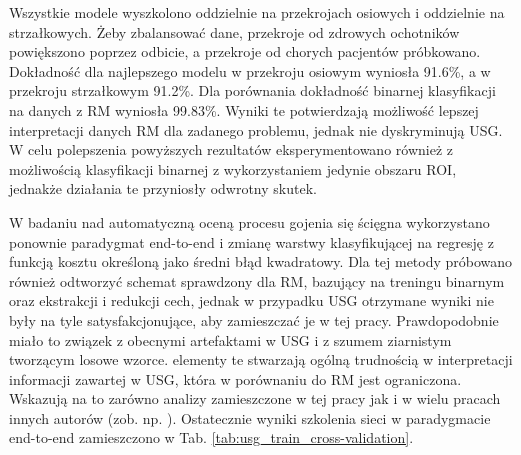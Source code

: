 Wszystkie modele wyszkolono oddzielnie na przekrojach osiowych i oddzielnie na strzałkowych. Żeby zbalansować dane, przekroje od zdrowych ochotników powiększono poprzez odbicie, a przekroje od chorych pacjentów próbkowano. Dokładność dla najlepszego modelu w przekroju osiowym wyniosła 91.6\%, a w przekroju strzałkowym 91.2\%. Dla porównania dokładność binarnej klasyfikacji na danych z RM wyniosła 99.83\%. Wyniki te potwierdzają możliwość lepszej interpretacji danych RM dla zadanego problemu, jednak nie dyskryminują USG. W celu polepszenia powyższych rezultatów eksperymentowano również z możliwością klasyfikacji binarnej z wykorzystaniem jedynie obszaru ROI, jednakże działania te przyniosły odwrotny skutek.  

W badaniu nad automatyczną oceną procesu gojenia się ścięgna wykorzystano ponownie paradygmat end-to-end i zmianę warstwy klasyfikującej na regresję z funkcją kosztu określoną jako średni błąd kwadratowy. Dla tej metody próbowano również odtworzyć schemat sprawdzony dla RM, bazujący na treningu binarnym oraz ekstrakcji i redukcji cech, jednak w przypadku USG otrzymane wyniki nie były na tyle satysfakcjonujące, aby zamieszczać je w tej pracy. Prawdopodobnie miało to związek z obecnymi artefaktami w USG i z szumem ziarnistym tworzącym losowe wzorce. elementy te stwarzają ogólną trudnością w interpretacji informacji zawartej w USG, która w porównaniu do RM jest ograniczona. Wskazują na to zarówno analizy zamieszczone w tej pracy jak i w wielu pracach innych autorów (zob. np. \cite{Khan2003, Ibrahim2013}). Ostatecznie wyniki szkolenia sieci w paradygmacie end-to-end zamieszczono w Tab. \ref{tab:usg_train_cross-validation}.


